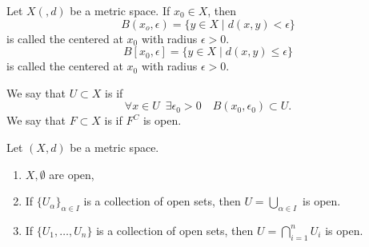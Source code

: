 \documentclass[notoc,notitlepage]{tufte-book}
\begin{document}
\begin{defn}\label{defn:open_n_closed}
  Let $X(, d)$ be a metric space. If $x_0 \in X$, then
  \begin{equation*}
    B(x_o, \epsilon) = \{ y \in X \mid d(x, y) < \epsilon \}
  \end{equation*}
  is called the  centered at $x_0$ with radius $\epsilon > 0$.
  \begin{equation*}
    B[x_0, \epsilon] = \{ y \in X \mid d(x, y) \leq \epsilon \}
  \end{equation*}
  is called the  centered at $x_0$ with radius $\epsilon > 0$.

  We say that $U \subset X$ is  if
  \begin{equation*}
    \forall x \in U \enspace \exists \epsilon_0 > 0 \quad B(x_0, \epsilon_0) \subset U.
  \end{equation*}
  We say that $F \subset X$ is  if $F^C$ is open.
\end{defn}

\begin{propo}\label{propo:properties_of_open_sets}
  Let $(X, d)$ be a metric space.
  \begin{enumerate}
    \item $X, \emptyset$ are open,
    \item If $\{ U_\alpha \}_{ \alpha \in I }$ is a collection of open sets, then $U = \bigcup_{\alpha \in I}$ is open.
    \item If $\{ U_1, \ldots, U_n \}$ is a collection of open sets, then $U = \bigcap_{i = 1}^{n} U_i$ is open.
  \end{enumerate}
\end{propo}
\end{document}
